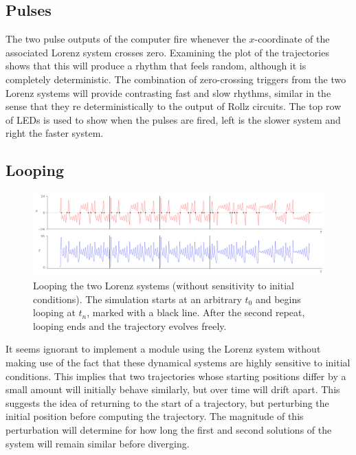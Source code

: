 \documentclass{tufte-handout}
\begin{document}

\subsection{Pulses}

The two pulse outputs of the computer fire whenever the $x$-coordinate of the associated Lorenz system crosses zero. Examining the plot of the trajectories shows that this will produce a rhythm that feels random, although it is completely deterministic. The combination of zero-crossing triggers from the two Lorenz systems will provide contrasting fast and slow rhythms, similar in the sense that they re deterministically  to the output of Rollz circuits. The top row of LEDs is used to show when the pulses are fired, left is the slower system and right the faster system.

\subsection{Looping}\label{sec:looping}


\begin{figure}[h]
  \includegraphics[width=\linewidth]{looping_voltages.png}%
  \caption{Looping the two Lorenz systems (without sensitivity to initial conditions). The simulation starts at an arbitrary $t_0$ and begins looping at $t_n$, marked with a black line. After the second repeat, looping ends and the trajectory evolves freely.}%
  \label{fig:looping_voltages}%
\end{figure}

It seems ignorant to implement a module using the Lorenz system without making use of the fact that these dynamical systems are highly sensitive to initial conditions. This implies that two trajectories whose starting positions differ by a small amount will initially behave similarly, but over time will drift apart.
This suggests the idea of returning to the start of a trajectory, but perturbing the initial position before computing the trajectory. The magnitude of this perturbation will determine for how long the first and second solutions of the system will remain similar before diverging.
\end{document}
